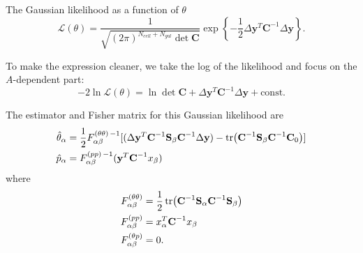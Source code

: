 \documentclass{article}
\begin{document}
The Gaussian likelihood as a function of $\theta$
\[
\mathcal{L}(\theta) = \frac{1}{\sqrt{\left(2\pi\right)^{N_{cell}+N_{gal}} \det \textbf{C}}}\exp\left\{-\frac{1}{2}\Delta \textbf{y}^T\textbf{C}^{-1}\Delta \textbf{y}\right\}.
\]\par
To make the expression cleaner, we take the log of the likelihood and focus on the $A$-dependent part:
\begin{equation}
-2\ln\mathcal{L}(\theta) = \ln\det\textbf{C} + \Delta \textbf{y}^T\textbf{C}^{-1}\Delta \textbf{y} + \text{const}.
\label{log:eqn}
\end{equation}

The estimator and Fisher matrix for this Gaussian likelihood are
\begin{align}
\hat{\theta}_\alpha & = \frac{1}{2} F^{(\theta \theta)\,-1}_{\alpha \beta} [(\Delta \textbf{y}^T \textbf{C}^{-1} \textbf{S}_\beta \textbf{C}^{-1} \Delta \textbf{y}) - \tr(\textbf{C}^{-1} \textbf{S}_\beta \textbf{C}^{-1} \textbf{C}_0)]\\
\hat{p}_\alpha  &=  F^{(pp)\, -1}_{\alpha \beta}  (\textbf{y}^T  \textbf{C}^{-1} x_\beta)
\end{align}
where  
\begin{align}
F^{(\theta\theta)}_{\alpha\beta}& = \frac{1}{2} \tr(\textbf{C}^{-1} \textbf{S}_\alpha \textbf{C}^{-1}  \textbf{S}_\beta)\\
F^{(pp)}_{\alpha\beta} & =x^T_\alpha \textbf{C}^{-1} x_\beta\\
F^{(\theta p)}_{\alpha\beta} & = 0.
\end{align}
\end{document}
